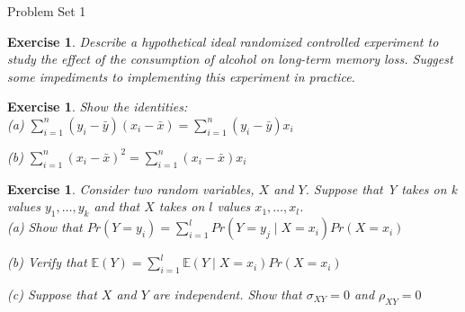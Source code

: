 \documentclass{article}
\newtheorem{exercise}[theorem]{Exercise}
\begin{document}
\begin{center}
{\Large Problem Set 1}
\end{center}


\begin{exercise} %
Describe a hypothetical ideal randomized controlled experiment to study the
effect of the consumption of alcohol on long-term memory loss. Suggest some
impediments to implementing this experiment in practice.
\end{exercise}


\begin{exercise}
Show the identities:\\

(a) $\sum\nolimits_{i=1}^{n}\left( y_{i}-\bar{y}\right) \left( x_{i}-\bar{x}%
\right) =\sum\nolimits_{i=1}^{n}\left( y_{i}-\bar{y}\right) x_{i}$

(b) $\sum\nolimits_{i=1}^{n}\left( x_{i}-\bar{x}\right)
^{2}=\sum\nolimits_{i=1}^{n}\left( x_{i}-\bar{x}\right) x_{i}$

\end{exercise}


\begin{exercise} %
Consider two random variables, $X$ and $Y$. Suppose that Y takes on k values
$y_1, \dots, y_k$ and that $X$ takes on $l$ values $x_1, \dots, x_l$.\\

(a) Show that $Pr(Y=y_i) = \sum_{i=1}^l Pr(Y=y_j \mid X = x_i) Pr(X=x_i)$

(b) Verify that $\mathbb{E}(Y) = \sum_{i=1}^l \mathbb{E}(Y\mid X=x_i) Pr(X=x_i)$

(c) Suppose that $X$ and $Y$ are independent. Show that $\sigma_{XY} = 0$ and
$\rho_{XY}=0$
\end{exercise}
\end{document}
